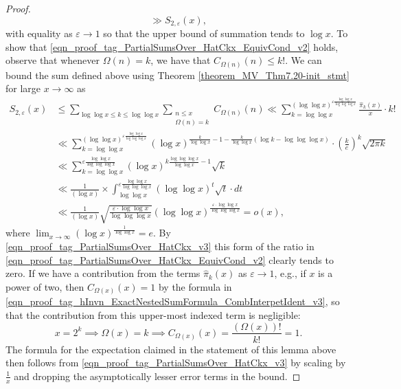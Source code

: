 \documentclass[11pt,reqno,a4letter]{article}
\numberwithin{figure}{section}
\numberwithin{table}{section}
\theoremstyle{plain}
\numberwithin{theorem}{section}
\theoremstyle{definition}
\begin{document}
\begin{proof}
\[     \gg S_{2,\varepsilon}(x),  
\]
with equality as $\varepsilon \rightarrow 1$ so that the upper bound of summation tends to $\log x$. 
To show that \eqref{eqn_proof_tag_PartialSumsOver_HatCkx_EquivCond_v2} holds, 
observe that whenever $\Omega(n) = k$, we have that $C_{\Omega(n)}(n) \leq k!$. 
We can bound the sum defined above using 
Theorem \ref{theorem_MV_Thm7.20-init_stmt} for large $x \rightarrow \infty$ as 
\begin{align*} 
S_{2,\varepsilon}(x) & \leq 
     \sum_{\log\log x \leq k \leq \log\log x} \sum_{\substack{n \leq x \\ \Omega(n)=k}} C_{\Omega(n)}(n) 
     \ll \sum_{k=\log\log x}^{(\log\log x)^{\varepsilon \frac{\log\log x}{\log\log\log x}}} 
      \frac{\widehat{\pi}_k(x)}{x} \cdot k! \\ 
     & \ll \sum_{k=\log\log x}^{(\log\log x)^{\varepsilon \frac{\log\log x}{\log\log\log x}}} 
     (\log x)^{\frac{k}{\log\log x} - 1 - \frac{k}{\log\log x} \left( 
     \log k - \log\log\log x\right)} \cdot \left(\frac{k}{e}\right)^{k} \sqrt{2\pi k} \\ 
     & \ll \sum_{k=\log\log x}^{\varepsilon \frac{\log\log x}{\log\log\log x}} 
     (\log x)^{k \frac{\log\log\log x}{\log\log x} - 1} \sqrt{k} \\ 
     & \ll \frac{1}{(\log x)} \times \int_{\log\log x}^{\varepsilon 
     \frac{\log\log x}{\log\log\log x}} (\log\log x)^t \sqrt{t} \cdot dt \\ 
     & \ll \frac{1}{(\log x)} \sqrt{\frac{\varepsilon \cdot \log\log x}{\log\log\log x}} 
     (\log\log x)^{\frac{\varepsilon \cdot \log\log x}{\log\log\log x}} = o(x), 
\end{align*} 
where $\lim_{x \rightarrow \infty} (\log x)^{\frac{1}{\log\log x}} = e$. 
By \eqref{eqn_proof_tag_PartialSumsOver_HatCkx_v3} this 
form of the ratio in \eqref{eqn_proof_tag_PartialSumsOver_HatCkx_EquivCond_v2} clearly tends to zero. 
If we have a contribution from the terms $\widehat{\pi}_k(x)$ as $\varepsilon \rightarrow 1$, 
e.g., if $x$ is a power of two, then $C_{\Omega(x)}(x) = 1$ by the formula in 
\eqref{eqn_proof_tag_hInvn_ExactNestedSumFormula_CombInterpetIdent_v3}, so that 
the contribution from this upper-most indexed term is negligible: 
\[
x=2^k \implies \Omega(x) = k \implies C_{\Omega(x)}(x) = \frac{(\Omega(x))!}{k!} = 1. 
\]
The formula for the expectation claimed in the statement of this lemma above then 
follows from \eqref{eqn_proof_tag_PartialSumsOver_HatCkx_v3} by scaling by 
$\frac{1}{x}$ and dropping the asymptotically lesser error terms in the bound. 
\end{proof} 
\end{document}
